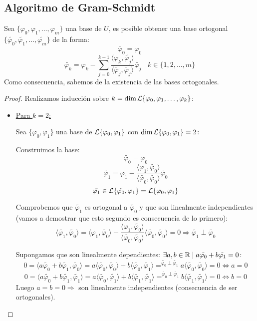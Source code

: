 \subsection{Algoritmo de Gram-Schmidt}
\begin{teo}
    Sea $\{\varphi_0, \varphi_1, \ldots, \varphi_m\}$ una base de $U$, es posible obtener una base ortogonal
    $\{\tilde{\varphi_0}, \tilde{\varphi_1}, \ldots, \tilde{\varphi_m}\}$ de la forma:
    $$\tilde{\varphi_0} = \varphi_0$$
    $$\tilde{\varphi_k} = \varphi_k - \sum_{j=0}^{k-1} \dfrac{\langle \varphi_k, \tilde{\varphi_j} \rangle}
        {\langle \tilde{\varphi_j}, \tilde{\varphi_j} \rangle} \tilde{\varphi_j}~~~~k \in \{1,2, \ldots, m\}$$
    Como consecuencia, sabemos de la existencia de las bases ortogonales.
\end{teo}
\begin{proof}
    Realizamos inducción sobre $k = \dim \mathcal{L} \{\varphi_0, \varphi_1, \ldots, \varphi_k\}$:
    \begin{itemize}
        \item \underline{Para $k=2$:}

        Sea $\{\varphi_0, \varphi_1\}$ una base de $\mathcal{L}\{\varphi_0, \varphi_1\}$ con $\dim
        \mathcal{L}\{\varphi_0, \varphi_1\} = 2$:\par
    Construimos la base:\newline
    $$\tilde{\varphi_0} = \varphi_0$$
    $$\tilde{\varphi_1} = \varphi_1 - \dfrac{\langle \varphi_1, \tilde{\varphi_0} \rangle}
        {\langle \tilde{\varphi_0}, \tilde{\varphi_0} \rangle} \tilde{\varphi_0}$$
    $$\tilde{\varphi_1} \in \mathcal{L}\{\tilde{\varphi_0}, \varphi_1\} = \mathcal{L}\{\varphi_0, \varphi_1\}$$

    \noindent
    Comprobemos que $\tilde{\varphi_1}$ es ortogonal a $\tilde{\varphi_0}$ y que son linealmente independientes
    (vamos a demostrar que esto segundo es consecuencia de lo primero):
    $$\langle \tilde{\varphi_1}, \tilde{\varphi_0} \rangle = \langle \varphi_1, \tilde{\varphi_0} \rangle -
        \dfrac{\langle \varphi_1, \tilde{\varphi_0} \rangle}{\langle \tilde{\varphi_0}, \tilde{\varphi_0} \rangle}
        \langle \tilde{\varphi_0}, \tilde{\varphi_0} \rangle = 0 \Rightarrow \tilde{\varphi_1} \perp \tilde{\varphi_0}$$

    Supongamos que son linealmente dependientes: $\exists a,b \in \mathbb R \mid a\tilde{\varphi_0} + b \tilde{\varphi_1} = 0$:
    $$0 = \langle a\tilde{\varphi_0} + b\tilde{\varphi_1}, \tilde{\varphi_0} \rangle = a\langle \tilde{\varphi_0},
        \tilde{\varphi_0} \rangle + b \langle \tilde{\varphi_0}, \tilde{\varphi_1} \rangle \mathop{=}^{\tilde{\varphi_0}
        \perp \tilde{\varphi_1}} a\langle \tilde{\varphi_0}, \tilde{\varphi_0} \rangle = 0 \Leftrightarrow a = 0$$
    $$0 = \langle a\tilde{\varphi_0} + b\tilde{\varphi_1}, \tilde{\varphi_1} \rangle = a \langle \tilde{\varphi_0},
        \tilde{\varphi_1} \rangle + b\langle \tilde{\varphi_1}, \tilde{\varphi_1} \rangle \mathop{=}^{\tilde{\varphi_0}
        \perp \tilde{\varphi_1}} b\langle \tilde{\varphi_1}, \tilde{\varphi_1} \rangle = 0 \Leftrightarrow b = 0$$
    Luego $a = b = 0 \Rightarrow$ son linealmente independientes (consecuencia de ser ortogonales).


\end{itemize}
\end{proof}
